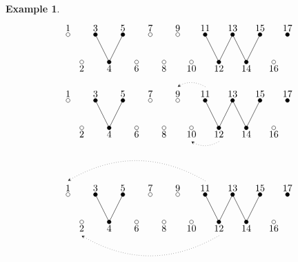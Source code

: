 \documentclass{amsart}
\newtheorem{example}[theorem]{Example}
\numberwithin{equation}{section}
\begin{document}
\begin{example}
\[\begin{tikzpicture}
          \foreach \i in {3,5,11,13,15,17}{
            \draw[fill=black] (0.5*\i,1) circle (2pt);
            \node[above] at (0.5*\i,1) {\i};}
          \foreach \i in {1,7,9}{
            \draw[fill=white] (0.5*\i,1) circle (2pt);
            \node[above] at (0.5*\i,1) {\i};}
          \foreach \i in {4,12,14}{
            \draw[fill=black] (0.5*\i,0) circle (2pt);
            \draw (0.5*\i,0) -- (0.5*\i-0.5,1);
            \draw (0.5*\i,0) -- (0.5*\i+0.5,1);
            \node[below] at (0.5*\i,0) {\i};}
          \foreach \i in {2,6,8,10,16}{
            \draw[fill=white] (0.5*\i,0) circle (2pt);
            \node[below] at (0.5*\i,0) {\i};}
        \end{tikzpicture}
      \]
      \[
        \begin{tikzpicture}
          \draw[dotted,-stealth] (5.5,1.5) to[out=150,in=30] (4.5,1.5);
          \draw[dotted,-stealth] (6,-0.5) to[out=210,in=-30] (5,-0.5);
          \foreach \i in {3,5,11,13,15,17}{
            \draw[fill=black] (0.5*\i,1) circle (2pt);
            \node[above] at (0.5*\i,1) {\i};}
          \foreach \i in {1,7,9}{
            \draw[fill=white] (0.5*\i,1) circle (2pt);
            \node[above] at (0.5*\i,1) {\i};}
          \foreach \i in {4,12,14}{
            \draw[fill=black] (0.5*\i,0) circle (2pt);
            \draw (0.5*\i,0) -- (0.5*\i-0.5,1);
            \draw (0.5*\i,0) -- (0.5*\i+0.5,1);
            \node[below] at (0.5*\i,0) {\i};}
          \foreach \i in {2,6,8,10,16}{
            \draw[fill=white] (0.5*\i,0) circle (2pt);
            \node[below] at (0.5*\i,0) {\i};}
        \end{tikzpicture}
      \]
      \[
        \begin{tikzpicture}
          \draw[dotted,-stealth] (5.5,1.5) to[out=150,in=30] (0.5,1.5);
          \draw[dotted,-stealth] (6,-0.5) to[out=210,in=-30] (1,-0.5);
          \foreach \i in {3,5,11,13,15,17}{
            \draw[fill=black] (0.5*\i,1) circle (2pt);
            \node[above] at (0.5*\i,1) {\i};}
          \foreach \i in {1,7,9}{
            \draw[fill=white] (0.5*\i,1) circle (2pt);
            \node[above] at (0.5*\i,1) {\i};}
          \foreach \i in {4,12,14}{
            \draw[fill=black] (0.5*\i,0) circle (2pt);
            \draw (0.5*\i,0) -- (0.5*\i-0.5,1);
            \draw (0.5*\i,0) -- (0.5*\i+0.5,1);
            \node[below] at (0.5*\i,0) {\i};}
          \foreach \i in {2,6,8,10,16}{
            \draw[fill=white] (0.5*\i,0) circle (2pt);
            \node[below] at (0.5*\i,0) {\i};}
        \end{tikzpicture}
\]
\end{example}
\end{document}
